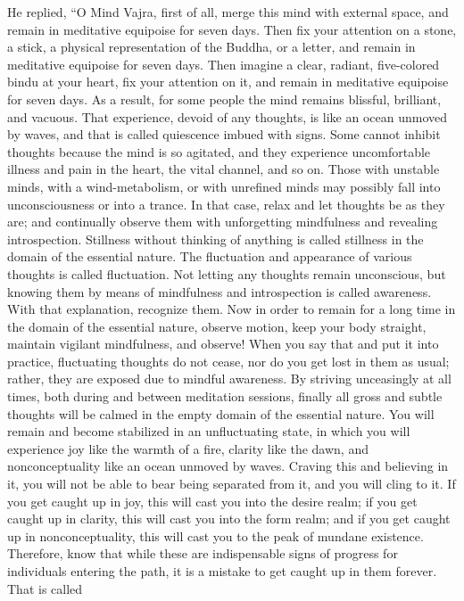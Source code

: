 \documentclass[a4paper,11pt,twoside,final]{book}
\begin{document}
He replied, ``O Mind Vajra, first of all, merge this mind with
external space, and remain in meditative equipoise for seven
days. Then fix your attention on a stone, a stick, a physical
representation of the Buddha, or a letter, and remain in meditative
equipoise for seven days. Then imagine a clear, radiant, five-colored
bindu at your heart, fix your attention on it, and remain in
meditative equipoise for seven days. As a result, for some people the
mind remains blissful, brilliant, and vacuous. That experience, devoid
of any thoughts, is like an ocean unmoved by waves, and that is called
quiescence imbued with signs. Some cannot inhibit thoughts because the
mind is so agitated, and they experience uncomfortable illness and
pain in the heart, the vital channel, and so on. Those with unstable
minds, with a wind-metabolism, or with unrefined minds may possibly
fall into unconsciousness or into a trance.  In that case, relax and
let thoughts be as they are; and continually observe them with
unforgetting mindfulness and revealing introspection. Stillness
without thinking of anything is called stillness in the domain of the
essential nature. The fluctuation and appearance of various thoughts
is called fluctuation. Not letting any thoughts remain unconscious,
but knowing them by means of mindfulness and introspection is called
awareness. With that explanation, recognize them.  Now in order to
remain for a long time in the domain of the essential nature, observe
motion, keep your body straight, maintain vigilant mindfulness, and
observe! When you say that and put it into practice, fluctuating
thoughts do not cease, nor do you get lost in them as usual; rather,
they are exposed due to mindful awareness. By striving unceasingly at
all times, both during and between meditation sessions, finally all
gross and subtle thoughts will be calmed in the empty domain of the
essential nature. You will remain and become stabilized in an
unfluctuating state, in which you will experience joy like the warmth
of a fire, clarity like the dawn, and nonconceptuality like an ocean
unmoved by waves. Craving this and believing in it, you will not be
able to bear being separated from it, and you will cling to it. If you
get caught up in joy, this will cast you into the desire realm; if you
get caught up in clarity, this will cast you into the form realm; and
if you get caught up in nonconceptuality, this will cast you to the
peak of mundane existence.  Therefore, know that while these are
indispensable signs of progress for individuals entering the path, it
is a mistake to get caught up in them forever.  That is called
\end{document}
